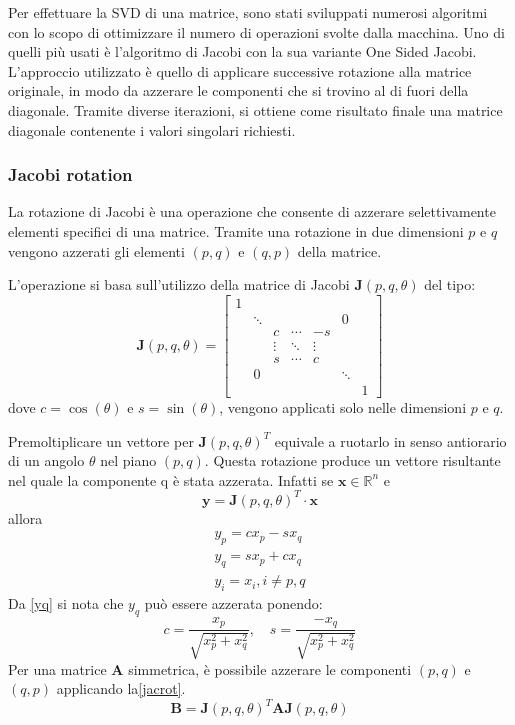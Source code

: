 Per effettuare la SVD di una matrice, sono stati sviluppati numerosi algoritmi con lo scopo di ottimizzare il numero di operazioni svolte dalla macchina.
Uno di quelli più usati è l'algoritmo di Jacobi con la sua variante One Sided Jacobi. L'approccio utilizzato è quello di applicare successive rotazione alla matrice originale, in modo da azzerare le componenti che si trovino al di fuori della diagonale. Tramite diverse iterazioni, si ottiene come risultato finale una matrice diagonale contenente i valori singolari richiesti.
\subsubsection{Jacobi rotation}
La rotazione di Jacobi è una operazione che consente di azzerare selettivamente elementi specifici di una matrice. Tramite una rotazione in due dimensioni $p$ e $q$ vengono azzerati gli elementi $(p,q)$ e $(q,p)$ della matrice.

L'operazione si basa sull'utilizzo della matrice di Jacobi $\mathbf{J}(p,q,\theta)$ del tipo:
\begin{equation}
\mathbf{J}(p,q,\theta)=\begin{bmatrix}
1 &  &  &  &  &  & \\
& \ddots &  &  &  & 0 & \\
&  & c & \cdots & -s &  & \\
&  & \vdots & \ddots & \vdots &  & \\
&  & s & \cdots & c &  & \\
& 0 &  &  &  & \ddots & \\
&  &  &  &  &  & 1
\end{bmatrix}
\end{equation}
dove $c=\cos(\theta)$ e $s=\sin(\theta)$, vengono applicati solo nelle dimensioni $p$ e $q$.

Premoltiplicare un vettore per $\mathbf{J}(p,q,\theta)^T$ equivale a ruotarlo in senso antiorario di un angolo $\theta$ nel piano $(p,q)$. Questa rotazione produce un vettore risultante nel quale la componente q è stata azzerata. Infatti se $\mathbf{x}\in\mathbb{R}^{n}$ e
\begin{equation}
\mathbf{y}=\mathbf{J}(p,q,\theta)^T	\cdot \mathbf{x}
\end{equation}
allora
\begin{eqnarray}
y_p=cx_p-sx_q\\
y_q=sx_p+cx_q\label{yq}\\
y_i=x_i, i\neq p,q
\end{eqnarray}
Da \eqref{yq} si nota che $y_q$ può essere azzerata ponendo:
\begin{equation}
c=\frac{x_p}{\sqrt{x_p^2+x_q^2}},\quad s=\frac{-x_q}{\sqrt{x_p^2+x_q^2}}
\end{equation}
Per una matrice $\mathbf{A}$ simmetrica, è possibile azzerare le componenti $(p,q)$ e $(q,p)$ applicando la\eqref{jacrot}.
\begin{equation}\label{jacrot}
\mathbf{B}=\mathbf{J}(p,q,\theta)^T\mathbf{A}\mathbf{J}(p,q,\theta)
\end{equation}
